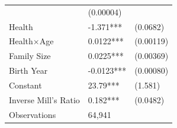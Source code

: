 \begin{tabular}{p{4.7cm}p{3.7cm}p{1.7cm}}
                    & (0.00004)   \\
Health                  &      -1.371***
                    &    (0.0682)   \\
Health$\times$Age              &       0.0122***
                    &   (0.00119)   \\
Family Size                &        0.0225***
                    &   (0.00369)   \\
Birth Year              &    -0.0123***
                    &  (0.00080)     \\
Constant            &         23.79***
                    &     (1.581)   \\[0.5ex]
           \midrule
           Inverse Mill's Ratio &   0.182***                    &    (0.0482)   \\[0.5ex]
            \midrule
                      Observations & 64,941\\[0.5ex]
                      \hline
                      \bottomrule
    \end{tabular}

